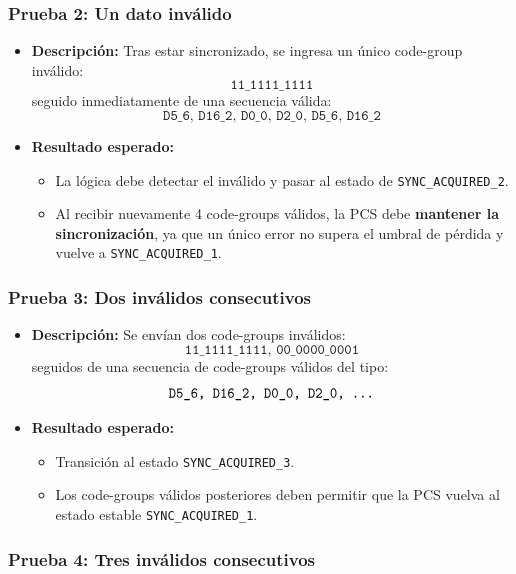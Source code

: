 \subsubsection*{Prueba 2: Un dato inválido}

\begin{itemize}
  \item \textbf{Descripción:}  
    Tras estar sincronizado, se ingresa un único code-group inválido:
    \[
      \texttt{11\_1111\_1111}
    \]
    seguido inmediatamente de una secuencia válida:
    \[
      \texttt{D5\_6, D16\_2, D0\_0, D2\_0, D5\_6, D16\_2}
    \]
  \item \textbf{Resultado esperado:}
    \begin{itemize}
      \item La lógica debe detectar el inválido y pasar al estado de \texttt{SYNC\_ACQUIRED\_2}.
      \item Al recibir nuevamente 4 code-groups válidos, la PCS debe \textbf{mantener la sincronización}, ya que un único error no supera el umbral de pérdida y vuelve a \texttt{SYNC\_ACQUIRED\_1}.
    \end{itemize}
\end{itemize}

\subsubsection*{Prueba 3: Dos inválidos consecutivos}

\begin{itemize}
  \item \textbf{Descripción:}  
    Se envían dos code-groups inválidos:
    \[
      \texttt{11\_1111\_1111,\ 00\_0000\_0001}
    \]
    seguidos de una secuencia de code-groups válidos del tipo:
    \[
      \texttt{D5\_6, D16\_2, D0\_0, D2\_0, \dots}
    \]
  \item \textbf{Resultado esperado:}
    \begin{itemize}
      \item Transición al estado \texttt{SYNC\_ACQUIRED\_3}.
      \item Los code-groups válidos posteriores deben permitir que la PCS vuelva al estado estable \texttt{SYNC\_ACQUIRED\_1}.
    \end{itemize}
\end{itemize}

\subsubsection*{Prueba 4: Tres inválidos consecutivos}


